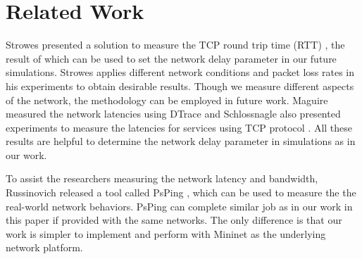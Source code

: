 \section{Related Work} \label{sec:related}

Strowes presented a solution to measure the TCP round trip time (RTT) \cite{Strowes:2013},
the result of which can be used to set the network delay parameter in our future simulations. 
Strowes applies different network conditions and packet loss rates in his experiments to 
obtain desirable results. Though we measure different aspects of the network, the methodology
can be employed in future work. Maguire measured the network latencies using DTrace \cite{Maguire:2010}
and Schlossnagle also presented experiments to measure the latencies
for services using TCP protocol \cite{Schlossnagle:2013}. 
All these results are helpful to determine the network delay parameter in simulations 
as in our work.

To assist the researchers
measuring the network latency and bandwidth, Russinovich released a tool called PsPing
\cite{PsPing:tool}, which can be used to measure the the real-world network behaviors. 
PsPing can complete similar job as in our work in this paper if provided with the same  
networks. The only difference is that our work is simpler to implement and 
perform with Mininet as the underlying network platform. 